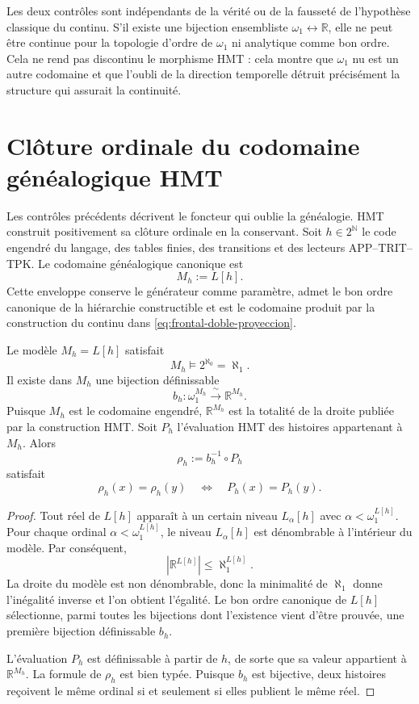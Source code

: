 Les deux contrôles sont indépendants de la vérité ou de la fausseté de l'hypothèse classique du
continu. S'il existe une bijection ensembliste
\(\omega_1\leftrightarrow\mathbb R\), elle ne peut être continue pour la
topologie d'ordre de \(\omega_1\) ni analytique comme bon ordre. Cela ne rend pas
discontinu le morphisme HMT : cela montre que \(\omega_1\) nu est un autre
codomaine et que l'oubli de la direction temporelle détruit précisément la
structure qui assurait la continuité.

\section{Clôture ordinale du codomaine généalogique HMT}

Les contrôles précédents décrivent le foncteur qui oublie la généalogie. HMT
construit positivement sa clôture ordinale en la conservant. Soit
\(h\in2^{\mathbb N}\) le code engendré du langage, des tables finies,
des transitions et des lecteurs APP--TRIT--TPK. Le codomaine généalogique
canonique est
\[
 M_h:=L[h].
\]
Cette enveloppe conserve le générateur comme paramètre, admet le bon ordre
canonique de la hiérarchie constructible et est le codomaine produit par la
construction du continu dans \eqref{eq:frontal-doble-proyeccion}.

\begin{theorem}
\label{p12-83-c19-s1:hmtch:thm-ch-relativa}
Le modèle \(M_h=L[h]\) satisfait
\[
 M_h\models 2^{\aleph_0}=\aleph_1.
\]
Il existe dans \(M_h\) une bijection définissable
\[
 b_h:\omega_1^{M_h}\xrightarrow{\ \sim\ }\mathbb R^{M_h}.
\]
Puisque \(M_h\) est le codomaine engendré, \(\mathbb R^{M_h}\) est la totalité de
la droite publiée par la construction HMT. Soit \(P_h\) l'évaluation HMT des
histoires appartenant à \(M_h\). Alors
\[
 \rho_h:=b_h^{-1}\circ P_h
\]
satisfait
\[
 \rho_h(x)=\rho_h(y)
 \quad\Longleftrightarrow\quad
 P_h(x)=P_h(y).
\]
\end{theorem}

\begin{proof}
Tout réel de \(L[h]\) apparaît à un certain niveau
\(L_\alpha[h]\) avec \(\alpha<\omega_1^{L[h]}\). Pour chaque ordinal
\(\alpha<\omega_1^{L[h]}\), le niveau \(L_\alpha[h]\) est dénombrable à l'intérieur
du modèle. Par conséquent,
\[
 |\mathbb R^{L[h]}|\leq\aleph_1^{L[h]}.
\]
La droite du modèle est non dénombrable, donc la minimalité de \(\aleph_1\)
donne l'inégalité inverse et l'on obtient l'égalité. Le bon ordre canonique
de \(L[h]\) sélectionne, parmi toutes les bijections dont l'existence vient
d'être prouvée, une première bijection définissable \(b_h\).

L'évaluation \(P_h\) est définissable à partir de \(h\), de sorte que sa valeur
appartient à \(\mathbb R^{M_h}\). La formule de \(\rho_h\) est bien typée.
Puisque \(b_h\) est bijective, deux histoires reçoivent le même ordinal si et seulement
si elles publient le même réel.
\end{proof}

